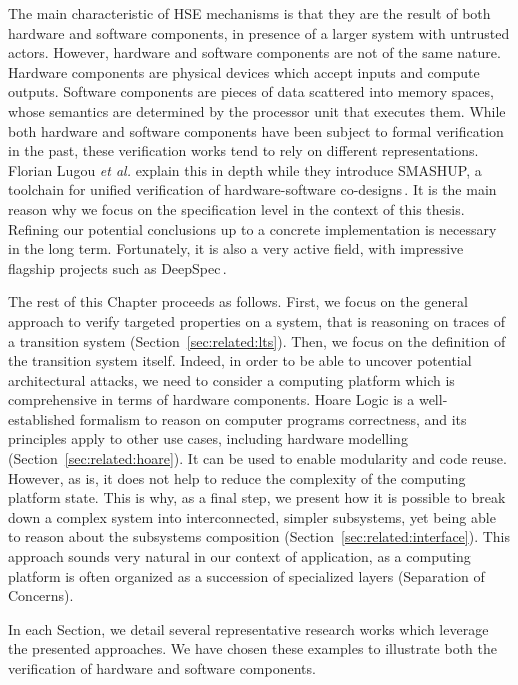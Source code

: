 The main characteristic of HSE mechanisms is that they are the result of both
hardware and software components, in presence of a larger system with untrusted
actors.
%
However, hardware and software components are not of the same nature.
%
Hardware components are physical devices which accept inputs and compute
outputs.
%
Software components are pieces of data scattered into memory spaces, whose
semantics are determined by the processor unit that executes them.
%
While both hardware and software components have been subject to formal
verification in the past, these verification works tend to rely on different
representations.
%
Florian Lugou \emph{et al.} explain this in depth while they introduce SMASHUP,
a toolchain for unified verification of hardware-software
co-designs\,\cite{lugou2017smashup}.
%
It is the main reason why we focus on the specification level in the context of
this thesis.
%
Refining our potential conclusions up to a concrete implementation is necessary
in the long term.
%
Fortunately, it is also a very active field, with impressive flagship projects
such as DeepSpec\,\cite{appel2017deepspec}.

The rest of this Chapter proceeds as follows.
%
First, we focus on the general approach to verify targeted properties on a
system, that is reasoning on traces of a transition system
(Section~\ref{sec:related:lts}).
%
Then, we focus on the definition of the transition system itself.
%
Indeed, in order to be able to uncover potential architectural attacks, we need
to consider a computing platform which is comprehensive in terms of hardware
components.
%
Hoare Logic is a well-established formalism to reason on computer programs
correctness, and its principles apply to other use cases, including hardware
modelling (Section~\ref{sec:related:hoare}).
%
It can be used to enable modularity and code reuse.
%
However, as is, it does not help to reduce the complexity of the computing
platform state.
%
This is why, as a final step, we present how it is possible to break down a
complex system into interconnected, simpler subsystems, yet being able to reason
about the subsystems composition (Section~\ref{sec:related:interface}).
%
This approach sounds very natural in our context of application, as a computing
platform is often organized as a succession of specialized layers (Separation of
Concerns).

In each Section, we detail several representative research works which leverage
the presented approaches.
%
We have chosen these examples to illustrate both the verification of hardware
and software components.

